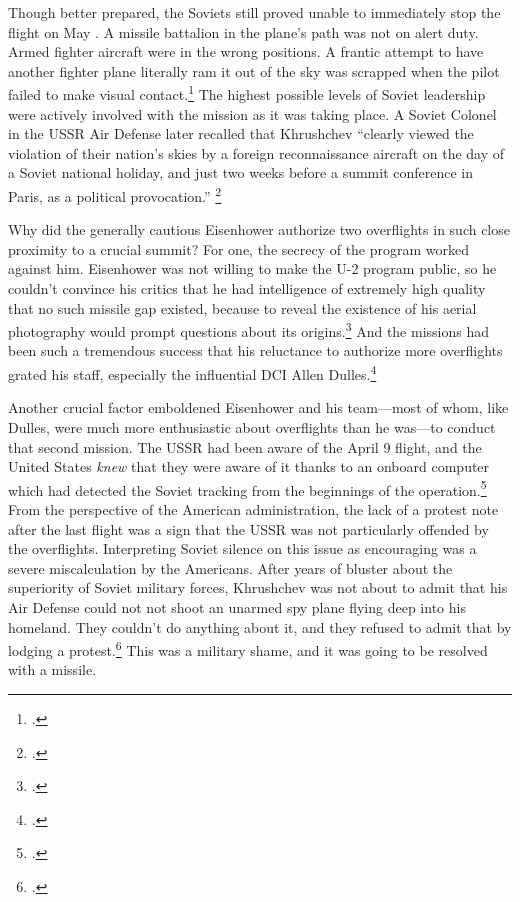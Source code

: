 \documentclass{report}
\begin{document}
\begin{refsegment}
Though better prepared, the Soviets still proved unable to immediately stop the flight on May . A missile battalion in the plane's path was not on alert duty. Armed fighter aircraft were in the wrong positions. A frantic attempt to have another fighter plane literally ram it out of the sky was scrapped when the pilot failed to make visual contact.\footcite{orlov_u-2_2007} The highest possible levels of Soviet leadership were actively involved with the mission as it was taking place. A Soviet Colonel in the USSR Air Defense later recalled that Khrushchev ``clearly viewed the violation of their nation's skies by a foreign reconnaissance aircraft on the day of a Soviet national holiday, and just two weeks before a summit conference in Paris, as a political provocation.'' \footcite{orlov_u-2_2007}

Why did the generally cautious Eisenhower authorize two overflights in such close proximity to a crucial summit? For one, the secrecy of the program worked against him. Eisenhower was not willing to make the U-2 program public, so he couldn't convince his critics that he had intelligence of extremely high quality that no such missile gap existed, because to reveal the existence of his aerial photography would prompt questions about its origins.\footcite[p.~51]{lindgren_trust_2000} And the missions had been such a tremendous success that his reluctance to authorize more overflights grated his staff, especially the influential DCI Allen Dulles.\footcite[p.~354]{brugioni_eyes_2010}

Another crucial factor emboldened Eisenhower and his team---most of whom, like Dulles, were much more enthusiastic about overflights than he was---to conduct that second mission. The USSR had been aware of the April 9 flight, and the United States \emph{knew} that they were aware of it thanks to an onboard computer which had detected the Soviet tracking from the beginnings of the operation.\footcite{pedlow_cia_1998} From the perspective of the American administration, the lack of a protest note after the last flight was a sign that the USSR was not particularly offended by the overflights. Interpreting Soviet silence on this issue as encouraging was a severe miscalculation by the Americans. After years of bluster about the superiority of Soviet military forces, Khrushchev was not about to admit that his Air Defense could not not shoot an unarmed spy plane flying deep into his homeland. They couldn't do anything about it, and they refused to admit that by lodging a protest.\footcite[p.~59]{powers_operation_2004} This was a military shame, and it was going to be resolved with a missile.


\end{refsegment}
\end{document}
